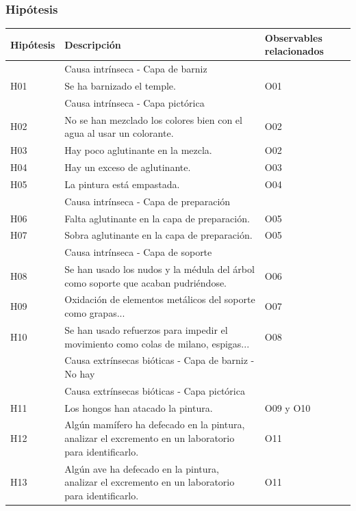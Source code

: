 \documentclass[a4paper,11pt]{article}
\begin{document}
			\subsubsection{Hipótesis}
			\begin{center}
				\begin{tabular}{| p{2cm} | p{6cm} | p{3cm} |}
					\hline
					\cellcolor[RGB]{224,233,250}\textbf{Hipótesis} &
					\cellcolor[RGB]{224,233,250}\textbf{Descripción} &
					\cellcolor[RGB]{224,233,250}\textbf{Observables relacionados}\\
					\hline
\cellcolor[RGB]{224,233,250} & \cellcolor[RGB]{224,233,250}Causa intrínseca - Capa de barniz &
\cellcolor[RGB]{224,233,250}\\
 \hline
H01 & Se ha barnizado el temple. & O01\\
\cellcolor[RGB]{224,233,250} & \cellcolor[RGB]{224,233,250}Causa intrínseca - Capa pictórica &
\cellcolor[RGB]{224,233,250}\\
 \hline
H02 & No se han mezclado los colores bien con el agua al usar un colorante. &
O02\\
\hline
H03 & Hay poco aglutinante en la mezcla. & O02\\
 \hline
H04 & Hay un exceso de aglutinante. & O03\\
 \hline
H05 & La pintura está empastada. & O04\\
 \hline
\cellcolor[RGB]{224,233,250} & \cellcolor[RGB]{224,233,250}Causa intrínseca - Capa de preparación &
\cellcolor[RGB]{224,233,250}\\
 \hline
H06 & Falta aglutinante en la capa de preparación. & O05\\
 \hline
H07 & Sobra aglutinante en la capa de preparación. & O05\\
\cellcolor[RGB]{224,233,250} & \cellcolor[RGB]{224,233,250}Causa intrínseca - Capa de soporte &
\cellcolor[RGB]{224,233,250}\\
 \hline
H08 & Se han usado los nudos y la médula del árbol como soporte que acaban
pudriéndose. & O06\\
 \hline
H09 & Oxidación de elementos metálicos del soporte como grapas... & O07\\
 \hline
H10 & Se han usado refuerzos para impedir el movimiento como colas de milano,
espigas... & O08\\
 \hline
\cellcolor[RGB]{224,233,250} & \cellcolor[RGB]{224,233,250}Causa extrínsecas bióticas - Capa de barniz -
No hay & \cellcolor[RGB]{224,233,250}\\
 \hline
\cellcolor[RGB]{224,233,250} & \cellcolor[RGB]{224,233,250}Causa extrínsecas bióticas - Capa pictórica
&\cellcolor[RGB]{224,233,250}
\\
 \hline
H11 & Los hongos han atacado la pintura. & O09 y O10\\
 \hline
H12 & Algún mamífero ha defecado en la pintura, analizar el excremento en un
laboratorio para identificarlo. & O11\\
 \hline
H13 & Algún ave ha defecado en la pintura, analizar el excremento en un laboratorio
para identificarlo. & O11\\
\hline
\end{tabular}
			\end{center}
\end{document}
